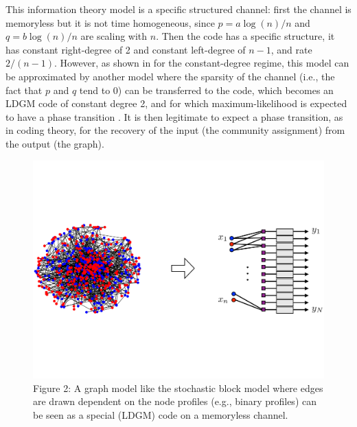 \documentclass[english]{article}
\newcommand{\1}{\textbf{1}}
\begin{document}
\begin{itemize}
This information theory model is a specific structured channel: first the channel is memoryless but it is not time homogeneous, since $p=a \log(n)/n$ and $q=b \log(n)/n$ are scaling with $n$. 
Then the code has a specific structure, it has constant right-degree of 2 and constant left-degree of $n-1$, and rate $2/(n-1)$. However, as shown in \cite{abbetoc} for the constant-degree regime, this model can be approximated by another model where the sparsity of the channel (i.e., the fact that $p$ and $q$ tend to 0) can be transferred to the code, which becomes an LDGM code of constant degree 2, and for which maximum-likelihood is expected to have a phase transition \cite{abbetoc,kumar}. It is then legitimate to expect a phase transition, as in coding theory, for the recovery of the input (the community assignment) from the output (the graph). 
\end{itemize}

\begin{figure}[h]
\begin{center}
\includegraphics[scale=.33]{ldpc.pdf}
\caption{Figure 2: A graph model like the stochastic block model where edges are drawn dependent on the node profiles (e.g., binary profiles) can be seen as a special (LDGM) code on a memoryless channel.}
\label{meet}
\end{center}
\end{figure}
\end{document}
